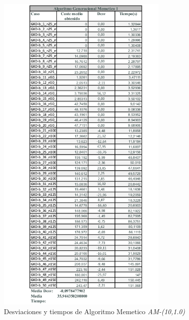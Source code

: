 \documentclass{article}
\begin{document}
\begin{figure}[h]
  \centering
  \includegraphics[width=0.75\textwidth]{capturastablas/Memetico1.png}
  \caption{Desviaciones y tiempos de Algoritmo Memetico \emph{AM-(10,1.0)}}
\end{figure}
\end{document}
